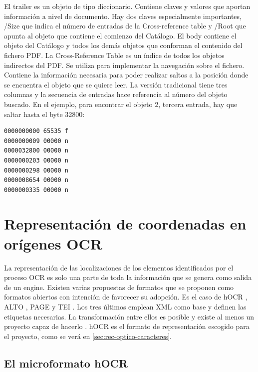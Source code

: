 El trailer es un objeto de tipo diccionario. Contiene claves y valores que aportan información a nivel de documento. Hay dos claves especialmente importantes, /Size que indica el número de entradas de la Cross-reference table y /Root que apunta al objeto que contiene el comienzo del Catálogo. El body contiene el objeto del Catálogo y todos los demás objetos que conforman el contenido del fichero PDF. La Cross-Reference Table es un índice de todos los objetos indirectos del PDF. Se utiliza para implementar la navegación sobre el fichero. Contiene la información necesaria para poder realizar saltos a la posición donde se encuentra el objeto que se quiere leer. La versión tradicional tiene tres columnas y la secuencia de entradas hace referencia al número del objeto buscado. En el ejemplo, para encontrar el objeto 2, tercera entrada, hay que saltar hasta el byte 32800:

\begin{lstlisting}[caption={Entradas en la Cross-Reference Table},label=lst:cross-ref-table]
0000000000 65535 f
0000000009 00000 n
0000032800 00000 n
0000000203 00000 n
0000000298 00000 n
0000008654 00000 n
0000000335 00000 n
\end{lstlisting}



\section{Representación de coordenadas en orígenes OCR}

La representación de las localizaciones de los elementos identificados por el proceso OCR es solo una parte de toda la información que se genera como salida de un engine. Existen varias propuestas de formatos que se proponen como formatos abiertos con intención de favorecer su adopción. Es el caso de hOCR \cite{ocrRepres_hocr_breuel_spec}, ALTO \cite{ocrRepres_alto_spec}, PAGE \cite{ocrRepres_page_pletschacher_paper} y TEI \cite{ocrRepres_tei_project}. Los tres últimos emplean XML como base y definen las etiquetas necesarias. La transformación entre ellos es posible y existe al menos un proyecto capaz de hacerlo
\cite{ocrRepres_conversion_ocrFileformat}. hOCR es el formato de representación escogido para el proyecto, como se verá en \ref{sec:rec-optico-caracteres}.

\subsection{El microformato hOCR}

